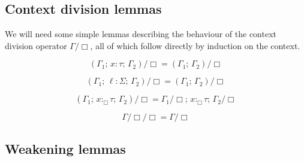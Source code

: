 \documentclass[acmsmall, screen, review, anonymous]{acmart}
\theoremstyle{definition}
\newcommand{\loc}{\ell}
\newcommand{\types}{\mathrel{:}}
\newcommand{\gtypes}{\mathrel{:_{\Box}}}
\newcommand{\ccons}[2]{#1;\,#2}
\newcommand{\lbind}[3]{\ccons{#1}{#2\types#3}}
\newcommand{\gbind}[3]{\ccons{#1}{#2\gtypes#3}}
\newcommand{\cdiv}[1]{#1/\Box}
\begin{document}
\subsection{Context division lemmas}

We will need some simple lemmas describing the behaviour of the context
division operator $\cdiv{\Gamma}$, all of which follow directly by
induction on the context.
\begin{lemma}
\label{lemma:local-cdiv}
  \begin{equation*}
    \cdiv{(\ccons{\lbind{\Gamma_1}{x}{\tau}}{\Gamma_2})} = \cdiv{(\ccons{\Gamma_1}{\Gamma_2})}
  \end{equation*}
\end{lemma}
\begin{lemma}
\label{lemma:yoneda-cdiv}
  \begin{equation*}
    \cdiv{(\ccons{\lbind{\Gamma_1}{\loc}{\Sigma}}{\Gamma_2})} = \cdiv{(\ccons{\Gamma_1}{\Gamma_2})}
  \end{equation*}
\end{lemma}
\begin{lemma}
\label{lemma:global-cdiv}
  \begin{equation*}
    \cdiv{(\ccons{\gbind{\Gamma_1}{x}{\tau}}{\Gamma_2})} = \ccons{\gbind{\cdiv{\Gamma_1}}{x}{\tau}}{\cdiv{\Gamma_2}}
  \end{equation*}
\end{lemma}
\begin{lemma}
\label{lemma:cdiv-idempotent}
  \begin{equation*}
    \cdiv{\cdiv{\Gamma}} = \cdiv{\Gamma}
  \end{equation*}
\end{lemma}

\subsection{Weakening lemmas}
\end{document}
